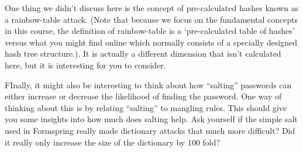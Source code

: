 One thing we didn’t discuss here is the concept of pre-calculated hashes known as a rainbow-table attack. (Note that because we focus on the fundamental concepts in this course, the definition of rainbow-table is a ‘pre-calculated table of hashes’ versus what you might find online which normally consists of a specially designed hash tree structure.). It is actually a different dimension that isn’t calculated here, but it is interesting for you to consider.

FInally, it might also be interesting to think about how “salting” passwords can either increase or decrease the likelihood of finding the password. One way of thinking about this is by relating “salting” to mangling rules. This should give you some insights into how much does salting help. Ask yourself if the simple salt used in Formspring really made dictionary attacks that much more difficult? Did it really only increase the size of the dictionary by 100 fold?

